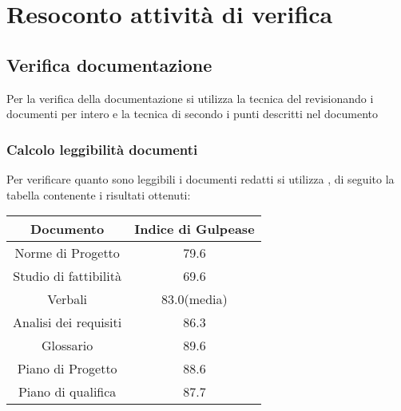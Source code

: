 \section{Resoconto attività di verifica}

\subsection{Verifica documentazione}
Per la verifica della documentazione si utilizza la tecnica del  revisionando i documenti per intero e la tecnica di  secondo i punti descritti nel documento 

\subsubsection{Calcolo leggibilità documenti}
Per verificare quanto sono leggibili i documenti redatti si utilizza , di seguito la tabella contenente i risultati ottenuti:

\begin{center}
	\begin{longtable}{|c|c|}
	\hline
	\rowcolor{lighter-grayer}
	\textbf{Documento} & \textbf{Indice di Gulpease} \\
	\hline
	\endfirsthead

	\hline
	Norme di Progetto &  79.6 \\
	\hline
	\hline
	Studio di fattibilità & 69.6 \\
	\hline
	\hline
	Verbali & 83.0(media) \\
	\hline
	\hline
	Analisi dei requisiti & 86.3 \\
	\hline
	\hline
	Glossario & 89.6 \\
	\hline
	\hline
	Piano di Progetto & 88.6 \\
	\hline
	\hline
	Piano di qualifica & 87.7 \\
	\hline

	\end{longtable}
\end{center}